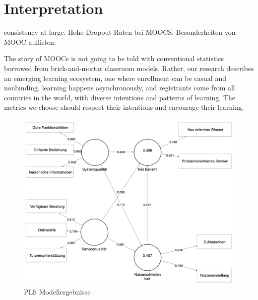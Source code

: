 \section{Interpretation}
\label{sec:vergleich}

\todo consistency at large. 
Hohe Dropout Raten bei MOOCS. Besonderheiten von MOOC auflisten: 


The story of MOOCs is not going to be told with conventional statistics borrowed from brick-and-mortar classroom models. Rather, our research describes an emerging learning ecosystem, one where enrollment can be casual and nonbinding, learning happens asynchronously, and registrants come from all countries in the world, with diverse intentions and patterns of learning. The metrics we choose should respect their intentions and encourage their learning.\parencite{reich2014tricky}


\begin{figure}[h]
\centering
\includegraphics[width=1\textwidth]{Grafiken/pls_bw.png}
\caption{PLS Modellergebnisse}
\label{PLS Modellergebnisse}
\end{figure}